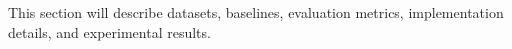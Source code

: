 This section will describe datasets, baselines, evaluation metrics, implementation details, and experimental results.
